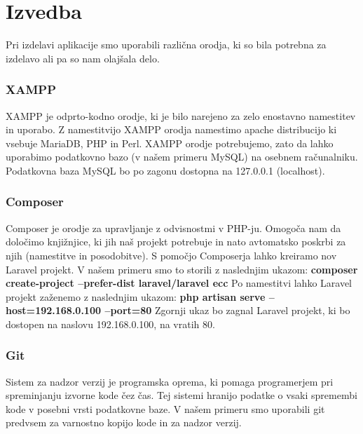 \documentclass[12pt,a4paper,titlepage,openany]{report}
\begin{document}
\chapter{Izvedba}
\thispagestyle{fancy}
Pri izdelavi aplikacije smo uporabili različna orodja, ki so bila potrebna za izdelavo ali pa so nam olajšala delo.

\subsection{XAMPP}
XAMPP je odprto-kodno orodje, ki je bilo narejeno za zelo enostavno namestitev in uporabo. Z namestitvijo XAMPP orodja namestimo apache distribucijo ki vsebuje MariaDB, PHP in Perl.
XAMPP orodje potrebujemo, zato da lahko uporabimo podatkovno bazo (v našem primeru MySQL) na osebnem računalniku. Podatkovna baza MySQL bo po zagonu dostopna na 127.0.0.1 (localhost).

\subsection{Composer}

Composer je orodje za upravljanje z odvisnostmi v PHP-ju. Omogoča nam da določimo knjižnjice, ki jih naš projekt potrebuje in nato avtomatsko poskrbi za njih (namestitve in posodobitve).
S pomočjo Composerja lahko kreiramo nov Laravel projekt. V našem primeru smo to storili z naslednjim ukazom:
\newline
\newline
\textbf{composer create-project --prefer-dist laravel/laravel ecc}
\newline
\newline
Po namestitvi lahko Laravel projekt zaženemo z naslednjim ukazom:
\newline
\newline
\textbf{php artisan serve --host=192.168.0.100 --port=80}
\newline
\newline
Zgornji ukaz bo zagnal Laravel projekt, ki bo dostopen na naslovu 192.168.0.100, na vratih 80. 

\subsection{Git}
Sistem za nadzor verzij je programska oprema, ki pomaga programerjem pri spreminjanju izvorne kode čez čas. Tej sistemi hranijo podatke o vsaki spremembi kode v posebni vrsti podatkovne baze. V našem primeru smo uporabili git predvsem za varnostno kopijo kode in za nadzor verzij.
\end{document}
